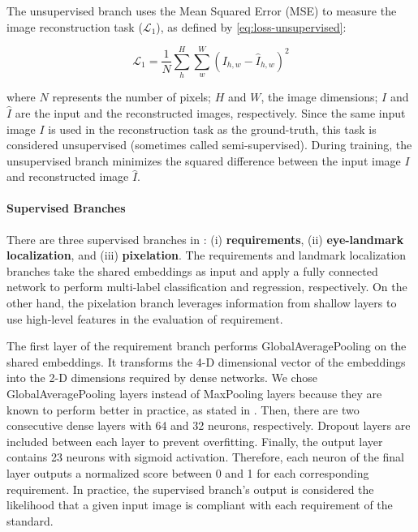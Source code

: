 The unsupervised branch uses the Mean Squared Error (MSE) to measure the image reconstruction task ($\mathcal{L}_1$), as defined by \autoref{eq:loss-unsupervised}:
 
\begin{equation}
\label{eq:loss-unsupervised}
\mathcal{L}_1 = \frac{1}{N} \sum_h^H \sum_w^W ({I_{h,w} - \hat{I}_{h,w}})^2
\end{equation}
 
\noindent where $N$ represents the number of pixels; $H$ and $W$, the image dimensions; $I$ and $\hat{I}$ are the input and the reconstructed images, respectively. Since the same input image $I$ is used in the reconstruction task as the ground-truth, this task is considered unsupervised (sometimes called semi-supervised). During training, the unsupervised branch minimizes the squared difference between the input image $I$ and reconstructed image $\hat{I}$.
 
\paragraph{Supervised Branches} \label{sec:supervisedbranches}
 
There are three supervised branches in \methodname: (i) \textbf{requirements}, (ii) \textbf{ eye-landmark localization}, and (iii) \textbf{pixelation}. The requirements and landmark localization branches take the shared embeddings as input and apply a fully connected network to perform multi-label classification and regression, respectively. On the other hand, the pixelation branch leverages information from shallow layers to use high-level features in the evaluation of \pixelation requirement. 
 
The first layer of the requirement branch performs GlobalAveragePooling on the shared embeddings. It transforms the 4-D dimensional vector of the embeddings into the 2-D dimensions required by dense networks. We chose GlobalAveragePooling layers instead of MaxPooling layers because they are known to perform better in practice, as stated in \cite{zhou2016learning}. Then, there are two consecutive dense layers with 64 and 32 neurons, respectively. Dropout layers are included between each layer to prevent overfitting. Finally, the output layer contains 23 neurons with sigmoid activation. Therefore, each neuron of the final layer outputs a normalized score between 0 and 1 for each corresponding requirement. In practice, the supervised branch's output is considered the likelihood that a given input image is compliant with each requirement of the \icao standard.
 
